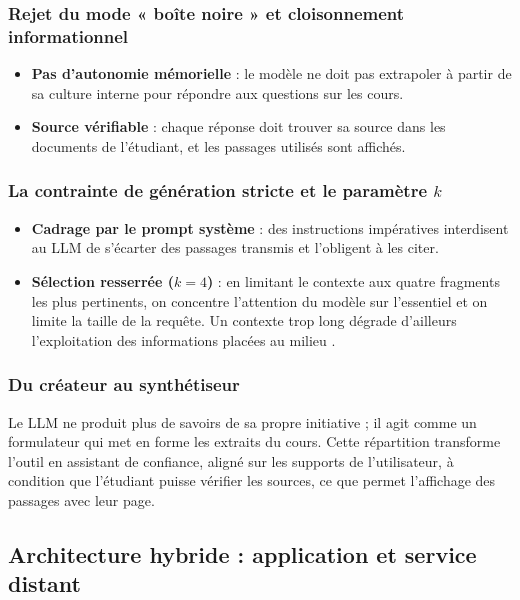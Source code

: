 \documentclass[12pt,a4paper,oneside]{report}
\begin{document}
\subsubsection*{Rejet du mode « boîte noire » et cloisonnement informationnel}

\begin{itemize}[nosep]
  \item \textbf{Pas d'autonomie mémorielle} : le modèle ne doit pas extrapoler à partir de sa culture interne pour répondre aux questions sur les cours.
  \item \textbf{Source vérifiable} : chaque réponse doit trouver sa source dans les documents de l'étudiant, et les passages utilisés sont affichés.
\end{itemize}

\subsubsection*{La contrainte de génération stricte et le paramètre $k$}

\begin{itemize}[nosep]
  \item \textbf{Cadrage par le prompt système} : des instructions impératives interdisent au LLM de s'écarter des passages transmis et l'obligent à les citer.
  \item \textbf{Sélection resserrée ($k = 4$)} : en limitant le contexte aux quatre fragments les plus pertinents, on concentre l'attention du modèle sur l'essentiel et on limite la taille de la requête. Un contexte trop long dégrade d'ailleurs l'exploitation des informations placées au milieu \cite{liu2024lost}.
\end{itemize}

\subsubsection*{Du créateur au synthétiseur}

Le LLM ne produit plus de savoirs de sa propre initiative ; il agit comme un formulateur qui met en forme les extraits du cours. Cette répartition transforme l'outil en assistant de confiance, aligné sur les supports de l'utilisateur, à condition que l'étudiant puisse vérifier les sources, ce que permet l'affichage des passages avec leur page.

\subsection{Architecture hybride : application et service distant}
\end{document}
